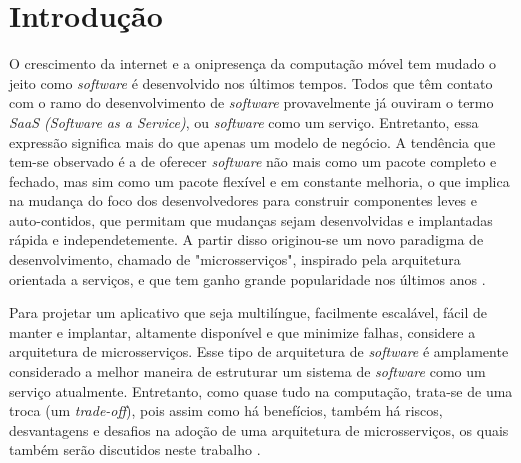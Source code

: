 \chapter{Introdução}\label{chapter-introducao}

O crescimento da internet e a onipresença da computação móvel tem mudado o jeito como \emph{software} é desenvolvido nos últimos tempos. Todos que têm contato com o ramo do desenvolvimento de \emph{software} provavelmente já ouviram o termo \emph{SaaS (Software as a Service)}, ou \emph{software} como um serviço. Entretanto, essa expressão significa mais do que apenas um modelo de negócio. A tendência que tem-se observado é a de oferecer \emph{software} não mais como um pacote completo e fechado, mas sim como um pacote flexível e em constante melhoria, o que implica na mudança do foco dos desenvolvedores para construir componentes leves e auto-contidos, que permitam que mudanças sejam desenvolvidas e implantadas rápida e independetemente. A partir disso originou-se um novo paradigma de desenvolvimento, chamado de "microsserviços", inspirado pela arquitetura orientada a serviços, e que tem ganho grande popularidade nos últimos anos \cite{middleware-microservices,design-monitoring-testing-waseem}.

Para projetar um aplicativo que seja multilíngue, facilmente escalável, fácil de manter e implantar, altamente disponível e que minimize falhas, considere a arquitetura de microsserviços. Esse tipo de arquitetura de \emph{software} é amplamente considerado a melhor maneira de estruturar um sistema de \emph{software} como um serviço atualmente. Entretanto, como quase tudo na computação, trata-se de uma troca (um \emph{trade-off}), pois assim como há benefícios, também há riscos, desvantagens e desafios na adoção de uma arquitetura de microsserviços, os quais também serão discutidos neste trabalho \cite{CAOPLE, oracle_microservices}.



